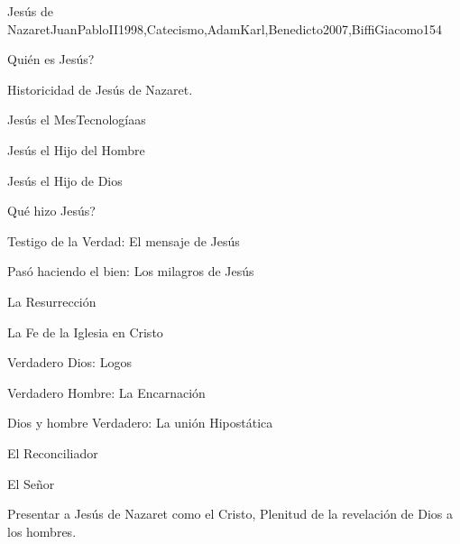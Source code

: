 \begin{syllabus}
\begin{unit}{Jesús de Nazaret}{JuanPabloII1998,Catecismo,AdamKarl,Benedicto2007,BiffiGiacomo}{15}{4}
\begin{topics}
      \item Quién es Jesús?
      \begin{inparaenum}
      \item Historicidad de Jesús de Nazaret.
      \item Jesús el MesTecnologíaas
      \item Jesús el Hijo del Hombre
      \item Jesús el Hijo de Dios
\end{inparaenum}
      \item Qué hizo Jesús?
      \begin{inparaenum}
      \item Testigo de la Verdad: El mensaje de Jesús
      \item Pasó haciendo el bien: Los milagros de Jesús
      \item La Resurrección
\end{inparaenum}
      \item La Fe de la Iglesia en Cristo
      \begin{inparaenum}
      \item Verdadero Dios: Logos
      \item Verdadero Hombre: La Encarnación
      \item Dios y hombre Verdadero: La unión Hipostática
      \item El Reconciliador
      \item El Señor
	\end{inparaenum}

\end{topics}

\begin{unitgoals}
      \item Presentar a Jesús de Nazaret como el Cristo, Plenitud de la revelación de Dios a los hombres.
\end{unitgoals}
\end{unit}


\end{syllabus}
